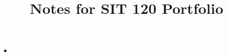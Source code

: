 \documentclass[]{article}
\title{Notes for SIT 120 Portfolio}
\begin{document}
	\maketitle

	\begin{itemize}
		\item
	\end{itemize}
\end{document}
